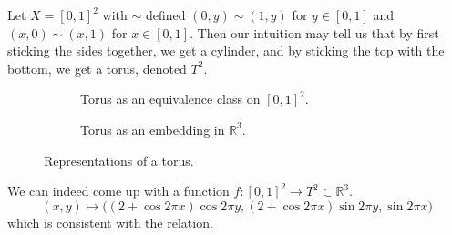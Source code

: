     \begin{example}[Torus]
      Let $X = [0,1]^2$ with $\sim$ defined $(0, y) \sim (1, y)$ for $y \in [0, 1]$ and $(x, 0) \sim (x, 1)$ for $x \in [0, 1]$. Then our intuition may tell us that by first sticking the sides together, we get a cylinder, and by sticking the top with the bottom, we get a torus, denoted $T^2$. 

      \begin{figure}[H]
        \centering
        \begin{subfigure}[b]{0.48\textwidth}
          \centering
          \caption{Torus as an equivalence class on $[0, 1]^2$.}
          \label{fig:square_torus}
        \end{subfigure}
        \hfill 
        \begin{subfigure}[b]{0.48\textwidth}
          \centering
          \caption{Torus as an embedding in $\mathbb{R}^3$.}
          \label{fig:torus}
        \end{subfigure}
        \caption{Representations of a torus.}
        \label{fig:geometric-figures}
      \end{figure}

      We can indeed come up with a function $f: [0, 1]^2 \rightarrow T^2 \subset \mathbb{R}^3$. 
      \begin{equation}
        (x, y) \mapsto \big( (2 + \cos{2 \pi x}) \cos{2\pi y}, (2 + \cos{2 \pi x}) \sin{2 \pi y}, \sin{2 \pi x} \big)
      \end{equation}
      which is consistent with the relation.  


\end{example}
